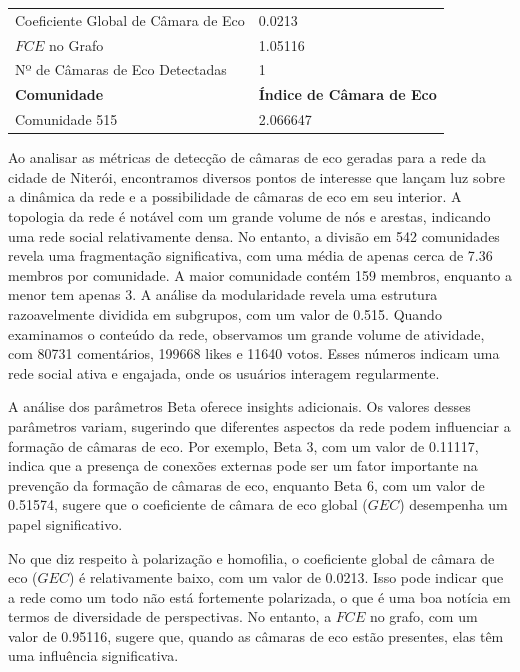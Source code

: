 \begin{table}[ht]
\begin{tabular}{l|l}
		\midrule
		Coeficiente Global de Câmara de Eco & 0.0213                           \\
		$FCE$ no Grafo                      & 1.05116                          \\
		Nº de Câmaras de Eco Detectadas     & 1                                \\
		\midrule
		\textbf{Comunidade}                 & \textbf{Índice de Câmara de Eco} \\
		\midrule
		Comunidade 515                      & 2.066647                         \\
		\bottomrule
	\end{tabular}
\end{table}

Ao analisar as métricas de detecção de câmaras de eco geradas para a rede da cidade de Niterói, encontramos diversos pontos de interesse que lançam luz sobre a dinâmica da rede e a possibilidade de câmaras de eco em seu interior. A topologia da rede é notável com um grande volume de nós e arestas, indicando uma rede social relativamente densa. No entanto, a divisão em 542 comunidades revela uma fragmentação significativa, com uma média de apenas cerca de 7.36 membros por comunidade. A maior comunidade contém 159 membros, enquanto a menor tem apenas 3. A análise da modularidade revela uma estrutura razoavelmente dividida em subgrupos, com um valor de 0.515. Quando examinamos o conteúdo da rede, observamos um grande volume de atividade, com 80731 comentários, 199668 likes e 11640 votos. Esses números indicam uma rede social ativa e engajada, onde os usuários interagem regularmente.

A análise dos parâmetros Beta oferece insights adicionais. Os valores desses parâmetros variam, sugerindo que diferentes aspectos da rede podem influenciar a formação de câmaras de eco. Por exemplo, Beta 3, com um valor de 0.11117, indica que a presença de conexões externas pode ser um fator importante na prevenção da formação de câmaras de eco, enquanto Beta 6, com um valor de 0.51574, sugere que o coeficiente de câmara de eco global ($GEC$) desempenha um papel significativo.

No que diz respeito à polarização e homofilia, o coeficiente global de câmara de eco ($GEC$) é relativamente baixo, com um valor de 0.0213. Isso pode indicar que a rede como um todo não está fortemente polarizada, o que é uma boa notícia em termos de diversidade de perspectivas. No entanto, a $FCE$ no grafo, com um valor de 0.95116, sugere que, quando as câmaras de eco estão presentes, elas têm uma influência significativa.


